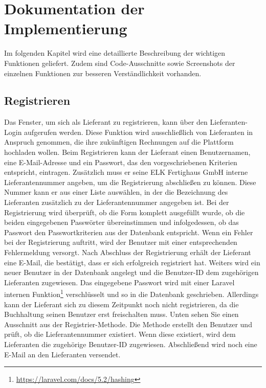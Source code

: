 \chapter{Dokumentation der Implementierung}
Im folgenden Kapitel wird eine detaillierte Beschreibung der wichtigen Funktionen geliefert. Zudem sind Code-Ausschnitte sowie Screenshots der einzelnen Funktionen zur besseren Verständlichkeit vorhanden. 

\section{Registrieren}
Das Fenster, um sich als Lieferant zu registrieren, kann über den Lieferanten-Login aufgerufen werden. Diese Funktion wird ausschließlich von Lieferanten in Anspruch genommen, die ihre zukünftigen Rechnungen auf die Plattform hochladen wollen. Beim Registrieren kann der Lieferant einen Benutzernamen, eine E-Mail-Adresse und ein Passwort, das den vorgeschriebenen Kriterien entspricht, eintragen. Zusätzlich muss er seine ELK Fertighaus GmbH interne Lieferantennummer angeben, um die Registrierung abschließen zu können. Diese Nummer kann er aus einer Liste auswählen, in der die Bezeichnung des Lieferanten zusätzlich zu der Lieferantennummer angegeben ist. Bei der Registrierung wird überprüft, ob die Form komplett ausgefüllt wurde, ob die beiden eingegebenen Passwörter übereinstimmen und infolgedessen, ob das Passwort den Passwortkriterien aus der Datenbank entspricht. Wenn ein Fehler bei der Registrierung auftritt, wird der Benutzer mit einer entsprechenden Fehlermeldung versorgt. Nach Abschluss der Registrierung erhält der Lieferant eine E-Mail, die bestätigt, dass er sich erfolgreich registriert hat. Weiters wird ein neuer Benutzer in der Datenbank angelegt und die Benutzer-ID dem zugehörigen Lieferanten zugewiesen. Das eingegebene Passwort wird mit einer Laravel internen Funktion\footnote{\url{https://laravel.com/docs/5.2/hashing}} verschlüsselt und so in die Datenbank geschrieben. Allerdings kann der Lieferant sich zu diesem Zeitpunkt noch nicht registrieren, da die Buchhaltung seinen Benutzer erst freischalten muss.
\newpage
Unten sehen Sie einen Ausschnitt aus der Registrier-Methode. Die Methode erstellt den Benutzer und prüft, ob die Lieferantennummer existiert. Wenn diese existiert, wird dem Lieferanten die zugehörige Benutzer-ID zugewiesen. Abschließend wird noch eine E-Mail an den Lieferanten versendet.

